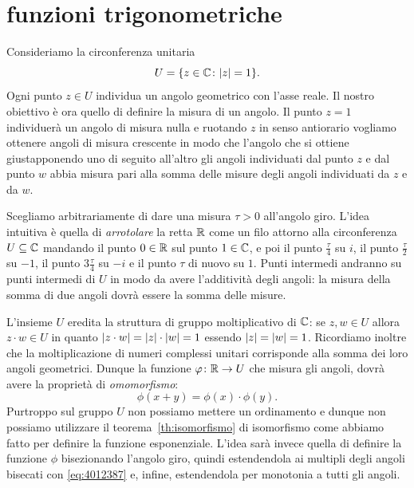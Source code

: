 \section{funzioni trigonometriche}
\label{sec:funzioni_trigonometriche}%

Consideriamo la circonferenza unitaria 
\[
  U = {\left\{ z\in {\mathbb C}\colon {\left|z\right|} = 1 \right\}}.
\]
Ogni punto $z\in U$ individua un angolo geometrico con l'asse reale.
Il nostro obiettivo è ora quello di definire la misura di un angolo.
Il punto $z=1$ individuerà un angolo di misura nulla e 
ruotando $z$ in senso antiorario vogliamo ottenere angoli 
di misura crescente in modo che l'angolo che si ottiene 
giustapponendo uno di seguito all'altro gli angoli individuati 
dal punto $z$ e dal punto $w$ abbia misura pari alla somma delle misure 
degli angoli individuati da $z$ e da $w$.

Scegliamo arbitrariamente di dare una misura $\tau>0$ all'angolo giro.
L'idea intuitiva è quella di \emph{arrotolare} la retta ${\mathbb R}$ come un filo 
attorno alla circonferenza $U\subseteq {\mathbb C}$ 
mandando il punto $0\in {\mathbb R}$ sul punto $1\in {\mathbb C}$,
e poi il punto $\frac \tau 4$ su $i$, il punto $\frac \tau 2$ su $-1$,
il punto $3\frac \tau 4$ su $-i$ e il punto $\tau$ di nuovo su $1$.
Punti intermedi andranno su punti intermedi di $U$ in modo da avere 
l'additività degli angoli: la misura della somma di due angoli dovrà 
essere la somma delle misure.

L'insieme $U$ eredita la struttura di gruppo moltiplicativo di ${\mathbb C}$: 
se $z,w\in U$ 
allora $z\cdot w \in U$ in quanto ${\left|z\cdot w\right|} = {\left|z\right|}\cdot {\left|w\right|} = 1$
essendo ${\left|z\right|}={\left|w\right|}=1$.
Ricordiamo inoltre che la moltiplicazione di numeri complessi unitari 
corrisponde alla somma dei loro angoli geometrici.
Dunque la funzione $\varphi\colon {\mathbb R} \to U$ che misura gli angoli, 
dovrà avere la proprietà di \emph{omomorfismo}:
\begin{equation}\label{eq:4012387}
  \phi(x+y) = \phi(x)\cdot \phi(y).
\end{equation}
Purtroppo sul gruppo $U$ non possiamo mettere un ordinamento e 
dunque non possiamo utilizzare il teorema~\ref{th:isomorfismo} 
di isomorfismo 
come abbiamo fatto per definire la funzione esponenziale.
L'idea sarà invece quella di definire la funzione $\phi$ 
bisezionando l'angolo giro, quindi estendendola ai multipli 
degli angoli bisecati con \eqref{eq:4012387}
e, infine, estendendola per monotonia a tutti gli angoli.

